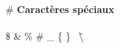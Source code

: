 \documentclass{article}
\begin{document}
\# \textbf{Caractères spéciaux} \\ \\
\$
\&
\%
\#
\_
\{
\}
\
\^
\textbackslash{}
\end{document}
